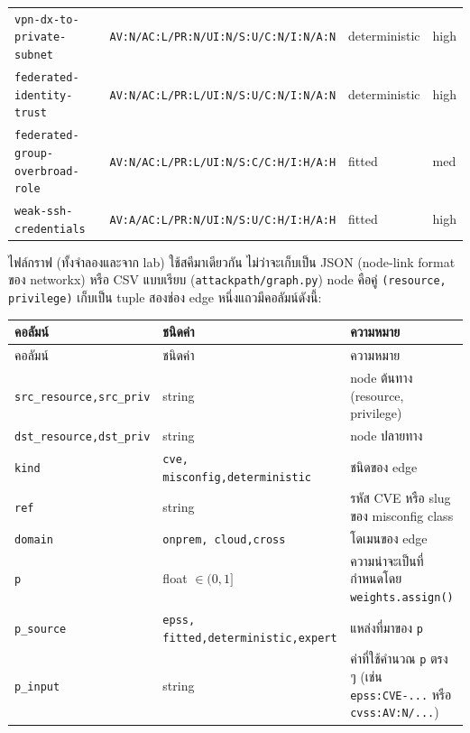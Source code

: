 \begin{longtable}{llll}
\texttt{\scriptsize vpn-dx-to-private-subnet} & \texttt{\scriptsize AV:N/AC:L/PR:N/UI:N/S:U/C:N/I:N/A:N} & deterministic & high \\
\texttt{\scriptsize federated-identity-trust} & \texttt{\scriptsize AV:N/AC:L/PR:L/UI:N/S:U/C:N/I:N/A:N} & deterministic & high \\
\texttt{\scriptsize federated-group-overbroad-role} & \texttt{\scriptsize AV:N/AC:L/PR:L/UI:N/S:C/C:H/I:H/A:H} & fitted & med \\
\texttt{\scriptsize weak-ssh-credentials} & \texttt{\scriptsize AV:A/AC:L/PR:N/UI:N/S:U/C:H/I:H/A:H} & fitted & high \\
\bottomrule
\end{longtable}


ไฟล์กราฟ (ทั้งจำลองและจาก lab) ใช้สคีมาเดียวกัน ไม่ว่าจะเก็บเป็น JSON (node-link format
ของ networkx) หรือ CSV แบบเรียบ (\texttt{attackpath/graph.py}) node คือคู่
\texttt{(resource, privilege)} เก็บเป็น tuple สองช่อง edge หนึ่งแถวมีคอลัมน์ดังนี้:

\begin{longtable}{p{3.3cm}p{3.3cm}p{6.4cm}}
\toprule
คอลัมน์ & ชนิดค่า & ความหมาย \\
\midrule
\endfirsthead
\toprule
คอลัมน์ & ชนิดค่า & ความหมาย \\
\midrule
\endhead
\texttt{\scriptsize src\_resource,\newline src\_priv} & string & node ต้นทาง (resource, privilege) \\
\texttt{\scriptsize dst\_resource,\newline dst\_priv} & string & node ปลายทาง \\
\texttt{kind} & \texttt{\scriptsize cve, misconfig,\newline deterministic} & ชนิดของ edge \\
\texttt{ref} & string & รหัส CVE หรือ slug ของ misconfig class \\
\texttt{domain} & \texttt{\scriptsize onprem, cloud,\newline cross} & โดเมนของ edge \\
\texttt{p} & float $\in (0,1]$ & ความน่าจะเป็นที่กำหนดโดย \texttt{weights.assign()} \\
\texttt{p\_source} & \texttt{\scriptsize epss, fitted,\newline deterministic,\newline expert} & แหล่งที่มาของ \texttt{p} \\
\texttt{p\_input} & string & ค่าที่ใช้คำนวณ \texttt{p} ตรง ๆ (เช่น \texttt{epss:CVE-...}
หรือ \texttt{cvss:AV:N/...}) \\
\bottomrule
\end{longtable}

